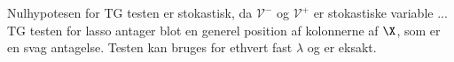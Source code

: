 Nulhypotesen for TG testen er stokastisk, da \(\mathcal{V}^-\) og \(\mathcal{V}^+\) er stokastiske variable ...
TG testen for lasso antager blot en generel position af kolonnerne af \(\X\), som er en svag antagelse.
Testen kan bruges for ethvert fast \(\lambda\) og er eksakt.
\newpage

